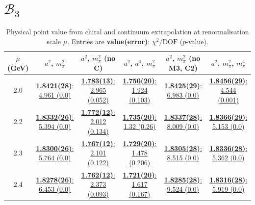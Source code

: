 \documentclass[12pt]{extarticle}
\begin{document}
\section{$\mathcal{B}_3$}
\begin{table}[h!]
\begin{center}
\begin{tabular}{|c|c|c|c|c|c|}
\hline
$\mu$ (GeV) & $a^2$, $m_\pi^2$& $a^2$, $m_\pi^2$ (no C)& $a^2$, $a^4$, $m_\pi^2$& $a^2$, $m_\pi^2$ (no M3, C2)& $a^2$, $m_\pi^2$, $m_\pi^4$\\
\hline
2.0& \hyperlink{SSmPP/NPR/a2m2_20.pdf.1}{\textbf{1.8421(28)}: 4.961 (0.0)} & \hyperlink{SSmPP/NPR/a2m2noC_20.pdf.1}{\textbf{1.783(13)}: 2.965 (0.052)} & \hyperlink{SSmPP/NPR/a2a4m2_20.pdf.1}{\textbf{1.750(20)}: 1.924 (0.103)} & \hyperlink{SSmPP/NPR/a2m2mcut_20.pdf.1}{\textbf{1.8425(29)}: 6.983 (0.0)} & \hyperlink{SSmPP/NPR/a2m2m4_20.pdf.1}{\textbf{1.8456(29)}: 4.544 (0.001)}\\
2.2& \hyperlink{SSmPP/NPR/a2m2_22.pdf.1}{\textbf{1.8332(26)}: 5.394 (0.0)} & \hyperlink{SSmPP/NPR/a2m2noC_22.pdf.1}{\textbf{1.772(12)}: 2.012 (0.134)} & \hyperlink{SSmPP/NPR/a2a4m2_22.pdf.1}{\textbf{1.735(20)}: 1.32 (0.26)} & \hyperlink{SSmPP/NPR/a2m2mcut_22.pdf.1}{\textbf{1.8337(28)}: 8.009 (0.0)} & \hyperlink{SSmPP/NPR/a2m2m4_22.pdf.1}{\textbf{1.8366(29)}: 5.153 (0.0)}\\
2.3& \hyperlink{SSmPP/NPR/a2m2_23.pdf.1}{\textbf{1.8300(26)}: 5.764 (0.0)} & \hyperlink{SSmPP/NPR/a2m2noC_23.pdf.1}{\textbf{1.767(12)}: 2.101 (0.122)} & \hyperlink{SSmPP/NPR/a2a4m2_23.pdf.1}{\textbf{1.729(20)}: 1.478 (0.206)} & \hyperlink{SSmPP/NPR/a2m2mcut_23.pdf.1}{\textbf{1.8305(28)}: 8.515 (0.0)} & \hyperlink{SSmPP/NPR/a2m2m4_23.pdf.1}{\textbf{1.8336(28)}: 5.362 (0.0)}\\
2.4& \hyperlink{SSmPP/NPR/a2m2_24.pdf.1}{\textbf{1.8278(26)}: 6.453 (0.0)} & \hyperlink{SSmPP/NPR/a2m2noC_24.pdf.1}{\textbf{1.762(12)}: 2.373 (0.093)} & \hyperlink{SSmPP/NPR/a2a4m2_24.pdf.1}{\textbf{1.721(20)}: 1.617 (0.167)} & \hyperlink{SSmPP/NPR/a2m2mcut_24.pdf.1}{\textbf{1.8285(28)}: 9.524 (0.0)} & \hyperlink{SSmPP/NPR/a2m2m4_24.pdf.1}{\textbf{1.8316(28)}: 5.919 (0.0)}\\
\hline
\end{tabular}
\caption{Physical point value from chiral and continuum extrapolation at renormalisation scale $\mu$. Entries are \textbf{value(error)}: $\chi^2/\text{DOF}$ ($p$-value).}
\end{center}
\end{table}
\end{document}
